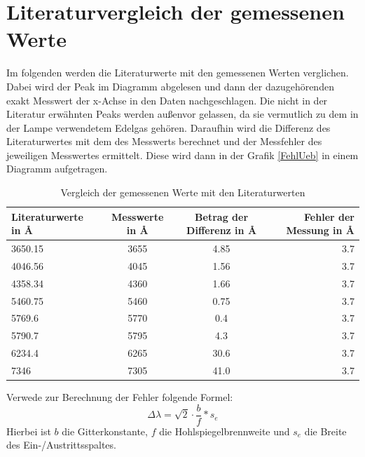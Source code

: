 \section{Literaturvergleich der gemessenen Werte} \label{Messlit}

Im folgenden werden die Literaturwerte \cite[S. 1474]{CRCHandbook2003} mit den gemessenen Werten verglichen. Dabei wird der Peak im Diagramm abgelesen und dann der dazugehörenden 
exakt Messwert der x-Achse in den Daten nachgeschlagen. Die nicht in der Literatur erwähnten Peaks werden außenvor gelassen, da sie vermutlich zu dem in der Lampe verwendetem Edelgas 
gehören. Daraufhin wird die Differenz des Literaturwertes mit dem des Messwerts berechnet und der Messfehler des jeweiligen Messwertes ermittelt. Diese wird dann in der Grafik \ref{FehlUeb} 
in einem Diagramm aufgetragen.
\begin{table}[h]
    \centering
    \begin{tabular}[h]{l|c|c|r}


        Literaturwerte in \r{A} & Messwerte in \r{A} & Betrag der Differenz in \r{A} & Fehler der Messung in \r{A}\\
       \hline
       3650.15  & 3655 & 4.85 & 3.7\\
       4046.56  & 4045 & 1.56 & 3.7\\
       4358.34 & 4360 & 1.66  & 3.7\\
       5460.75 & 5460 & 0.75 & 3.7\\
       5769.6  & 5770 & 0.4 & 3.7\\
       5790.7  & 5795 & 4.3 & 3.7\\
       6234.4  & 6265 & 30.6 & 3.7\\
       7346  & 7305 & 41.0 & 3.7\\
\end{tabular}
    \caption{Vergleich der gemessenen Werte mit den Literaturwerten}
\end{table}
Verwede zur Berechnung der Fehler folgende Formel:
\begin{equation}
    \Delta \lambda = \sqrt{2} \cdot\frac{b}{f}*s_e 
\end{equation}
Hierbei ist $b$ die Gitterkonstante, $f$ die Hohlspiegelbrennweite und $s_e$ die Breite des Ein-/Austrittsspaltes.\\
